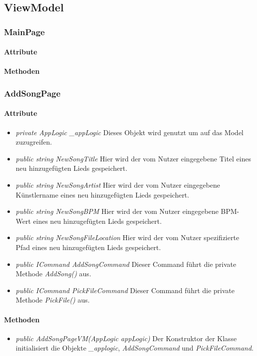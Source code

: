 \documentclass[../entwurf.tex]{subfiles}
\begin{document}
\newcommand{\attr}[1]{\item \textit{#1}}

\subsection{ViewModel}
\subsubsection{MainPage}
\paragraph{Attribute}
\paragraph{Methoden}
\subsubsection{AddSongPage}
\paragraph{Attribute}
\begin{itemize}
	\attr{private AppLogic \_appLogic} Dieses Objekt wird genutzt um auf das Model zuzugreifen.
	\attr{public string NewSongTitle} Hier wird der vom Nutzer eingegebene Titel eines neu hinzugefügten Lieds gespeichert.
	\attr{public string NewSongArtist} Hier wird der vom Nutzer eingegebene Künstlername eines neu hinzugefügten Lieds gespeichert.
	\attr{public string NewSongBPM} Hier wird der vom Nutzer eingegebene BPM-Wert eines neu hinzugefügten Lieds gespeichert.
	\attr{public string NewSongFileLocation} Hier wird der vom Nutzer spezifizierte Pfad eines neu hinzugefügten Lieds gespeichert.
	\attr{public ICommand AddSongCommand} Dieser Command führt die private Methode \textit{AddSong()} aus.
	\attr{public ICommand PickFileCommand} Dieser Command führt die private Methode \textit{PickFile()} aus.
\end{itemize}
\paragraph{Methoden}
\begin{itemize}
	\attr{public AddSongPageVM(AppLogic appLogic)} Der Konstruktor der Klasse initialisiert die Objekte \textit{\_applogic}, \textit{AddSongCommand} und \textit{PickFileCommand}.
\end{itemize}
\end{document}
